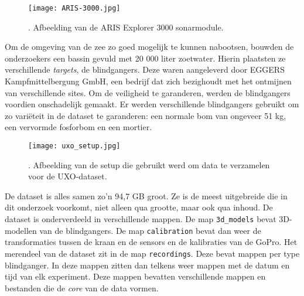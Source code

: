 \begin{figure}[H]
    \centering
    \texttt{[image: ARIS-3000.jpg]}
    \caption[Afbeelding van de ARIS Explorer 3000]{\label{fig:aris_3000}. Afbeelding van de ARIS Explorer 3000 sonarmodule.}
\end{figure}

Om de omgeving van de zee zo goed mogelijk te kunnen nabootsen, bouwden de onderzoekers een bassin gevuld met 20 000 liter zoetwater. Hierin plaatsten ze verschillende \emph{targets}, de \glspl{blindganger}. Deze waren aangeleverd door EGGERS Kampfmittelbergung GmbH, een bedrijf dat zich bezighoudt met het ontmijnen van verschillende sites. Om de veiligheid te garanderen, werden de \glspl{blindganger} voordien onschadelijk gemaakt. Er werden verschillende \glspl{blindganger} gebruikt om zo variëteit in de dataset te garanderen: een normale bom van ongeveer 51 kg, een vervormde fosforbom en een mortier. \autocite{Dahn_2024}

\begin{figure}[H]
    \centering
    \texttt{[image: uxo\_setup.jpg]}
    \caption[Setup waarmee de UXO-dataset gemaakt is]{\label{fig:uxo_setup}. Afbeelding van de setup die gebruikt werd om data te verzamelen voor de UXO-dataset. \autocite{Dahn_2024_UXO}}
\end{figure}

De dataset is alles samen zo'n 94,7 GB groot. Ze is de meest uitgebreide die in dit onderzoek voorkomt, niet alleen qua grootte, maar ook qua inhoud. De dataset is onderverdeeld in verschillende mappen. De map \texttt{3d\_models} bevat 3D-modellen van de \glspl{blindganger}. De map \texttt{calibration} bevat dan weer de transformaties tussen de kraan en de sensors en de kalibraties van de GoPro. Het merendeel van de dataset zit in de map \texttt{recordings}. Deze bevat mappen per type \gls{blindganger}. In deze mappen zitten dan telkens weer mappen met de datum en tijd van elk experiment. Deze mappen bevatten verschillende mappen en bestanden die de \emph{core} van de data vormen. \autocite{Dahn_2024_UXO}

\clearpage

